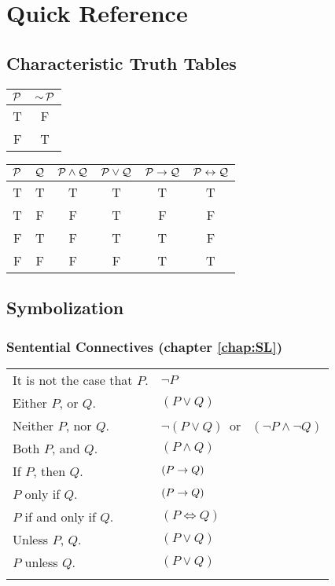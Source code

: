 
\chapter{Quick Reference}\label{app:quickreference}


\section{Characteristic Truth Tables}

\begin{tabular}{c|c}
$\mathcal{P}$ & $\mathop{\sim}\mathcal{P}$\\
\hline
T & F\\
F & T
\end{tabular}
\hspace{1in}
\begin{tabular}{c|c|c|c|c|c}
$\mathcal{P}$ & $\mathcal{Q}$ & $\mathcal{P}\land\mathcal{Q}$ & $\mathcal{P}\lor\mathcal{Q}$ & $\mathcal{P}\mathrel{\rightarrow}\mathcal{Q}$ & $\mathcal{P}\mathrel{\leftrightarrow}\mathcal{Q}$\\
\hline
T & T & T & T & T & T\\
T & F & F & T & F & F\\
F & T & F & T & T & F\\
F & F & F & F & T & T
\end{tabular}




\section{Symbolization}

\subsection{Sentential Connectives (chapter \ref{chap:SL})}

\begin{longtabu} to \textwidth {X[1,r] X[1,1]}
It is not the case that $P$. & $\lnot P$\\
Either $P$, or $Q$. & $(P \lor Q)$\\
Neither $P$, nor $Q$. & $\lnot(P \lor Q)$\ or \ $(\lnot P \land \lnot Q)$\\
Both $P$, and $Q$. & $(P \land Q)$\\
If $P$, then $Q$. & $(P \mathrel{\rightarrow} Q)$\\
$P$ only if $Q$. & $(P \mathrel{\rightarrow} Q)$\\
$P$ if and only if $Q$. & $(P \iff Q)$\\
Unless $P$, $Q$. & $(P \lor Q)$\\
$P$ unless $Q$. & $(P \lor Q)$\\
\\
\end{longtabu}

